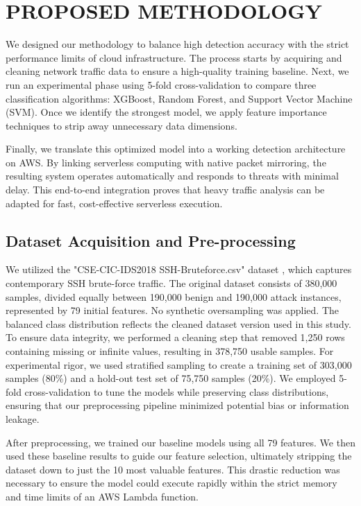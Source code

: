 \documentclass[conference]{IEEEtran}
\begin{document}
\section{PROPOSED METHODOLOGY}

We designed our methodology to balance high detection accuracy with the strict performance limits of cloud infrastructure. The process starts by acquiring and cleaning network traffic data to ensure a high-quality training baseline. Next, we run an experimental phase using 5-fold cross-validation to compare three classification algorithms: XGBoost, Random Forest, and Support Vector Machine (SVM). Once we identify the strongest model, we apply feature importance techniques to strip away unnecessary data dimensions.

Finally, we translate this optimized model into a working detection architecture on AWS. By linking serverless computing with native packet mirroring, the resulting system operates automatically and responds to threats with minimal delay. This end-to-end integration proves that heavy traffic analysis can be adapted for fast, cost-effective serverless execution.

\subsection{Dataset Acquisition and Pre-processing}

We utilized the "CSE-CIC-IDS2018 SSH-Bruteforce.csv" dataset \cite{b14}, which captures contemporary SSH brute-force traffic. The original dataset consists of 380,000 samples, divided equally between 190,000 benign and 190,000 attack instances, represented by 79 initial features. No synthetic oversampling was applied. The balanced class distribution reflects the cleaned dataset version used in this study. To ensure data integrity, we performed a cleaning step that removed 1,250 rows containing missing or infinite values, resulting in 378,750 usable samples. For experimental rigor, we used stratified sampling to create a training set of 303,000 samples (80\%) and a hold-out test set of 75,750 samples (20\%). We employed 5-fold cross-validation to tune the models while preserving class distributions, ensuring that our preprocessing pipeline minimized potential bias or information leakage.

After preprocessing, we trained our baseline models using all 79 features. We then used these baseline results to guide our feature selection, ultimately stripping the dataset down to just the 10 most valuable features. This drastic reduction was necessary to ensure the model could execute rapidly within the strict memory and time limits of an AWS Lambda function.
\end{document}

